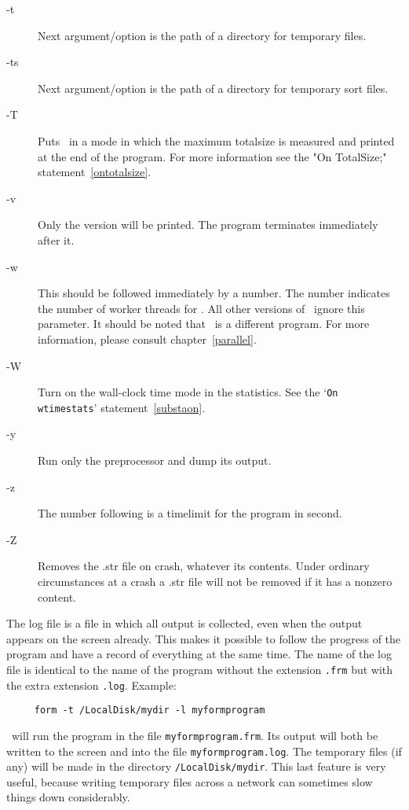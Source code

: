 \begin{description}
\item[-t] Next argument/option is the path of a directory for temporary files.
\item[-ts] Next argument/option is the path of a directory for temporary sort 
     files.
\item[-T] Puts \FORM\ in a mode in which the maximum 
     totalsize is measured and printed at the end of the program. For more 
     information see the "On TotalSize;" statement~\ref{ontotalsize}.
\item[-v] Only the version will be printed. The program terminates 
     immediately after it.
\item[-w] This should be followed immediately by a number. The 
     number indicates the number of worker threads for \TFORM. All other 
     versions of \FORM\ ignore this parameter. It should be noted that \TFORM\ 
     is a different program. For more information, please consult 
     chapter~\ref{parallel}.
\item[-W] Turn on the wall-clock time mode in the statistics. 
     See the `\texttt{On wtimestats}' statement~\ref{substaon}.
\item[-y] Run only the preprocessor and dump its output.
\item[-z] The number following is a timelimit for the program in second.
\item[-Z] Removes the .str file on crash, whatever its contents. Under 
     ordinary circumstances at a crash a .str file will not be removed if 
     it has a nonzero content.
\end{description}

\noindent The log file is a file in which all 
output is collected, even when the output appears on the screen already. 
This makes it possible to follow the progress of the program and have a 
record of everything at the same time. The name of the log file is 
identical to the name of the program without the extension \verb:.frm: but 
with the extra extension \verb:.log:.
Example:
\begin{center}
\begin{verbatim}
     form -t /LocalDisk/mydir -l myformprogram
\end{verbatim}
\end{center}
\FORM\ will run the program in the file \verb:myformprogram.frm:. Its output 
will both be written to the screen and into the file 
\verb:myformprogram.log:. The temporary files (if any) will be made in the 
directory \verb:/LocalDisk/mydir:. This last feature is very useful, 
because writing temporary files across a network can sometimes slow things 
down considerably.

